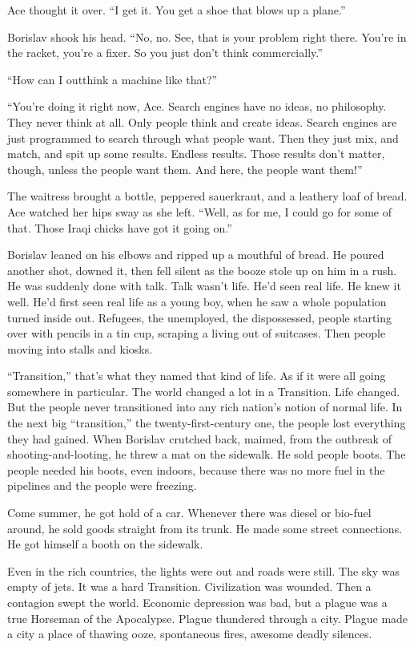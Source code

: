 \documentclass[20 pt,twoside,extrafontsizes,final]{memoir}
\begin{document}
Ace thought it over. ``I get it. You get a shoe that blows up a plane.''

Borislav shook his head. ``No, no. See, that is your problem right there. You're in the racket, you're a fixer. So you just don't think commercially.''

``How can I outthink a machine like that?''

``You're doing it right now, Ace. Search engines have no ideas, no philosophy. They never think at all. Only people think and create ideas. Search engines are just programmed to search through what people want. Then they just mix, and match, and spit up some results. Endless results. Those results don't matter, though, unless the people want them. And here, the people want them!''

The waitress brought a bottle, peppered sauerkraut, and a leathery loaf of bread. Ace watched her hips sway as she left. ``Well, as for me, I could go for some of that. Those Iraqi chicks have got it going on.''

Borislav leaned on his elbows and ripped up a mouthful of bread. He poured another shot, downed it, then fell silent as the booze stole up on him in a rush. He was suddenly done with talk. Talk wasn't life. He'd seen real life. He knew it well. He'd first seen real life as a young boy, when he saw a whole population turned inside out. Refugees, the unemployed, the dispossessed, people starting over with pencils in a tin cup, scraping a living out of suitcases. Then people moving into stalls and kiosks.

``Transition,'' that's what they named that kind of life. As if it were all going somewhere in particular. The world changed a lot in a Transition. Life changed. But the people never transitioned into any rich nation's notion of normal life. In the next big ``transition,'' the twenty-first-century one, the people lost everything they had gained. When Borislav crutched back, maimed, from the outbreak of shooting-and-looting, he threw a mat on the sidewalk. He sold people boots. The people needed his boots, even indoors, because there was no more fuel in the pipelines and the people were freezing.

Come summer, he got hold of a car. Whenever there was diesel or bio-fuel around, he sold goods straight from its trunk. He made some street connections. He got himself a booth on the sidewalk. 

Even in the rich countries, the lights were out and roads were still. The sky was empty of jets. It was a hard Transition. Civilization was wounded. Then a contagion swept the world. Economic depression was bad, but a plague was a true Horseman of the Apocalypse. Plague thundered through a city. Plague made a city a place of thawing ooze, spontaneous fires, awesome deadly silences.
\end{document}
